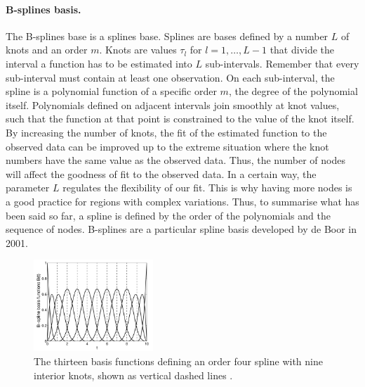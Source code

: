 \paragraph{B-splines basis.} The B-splines base is a splines base. Splines are bases defined by a number $L$ of knots and an order $m$. Knots are values $\tau_l$ for $l=1,\dots,L-1$ that divide the interval a function has to be estimated into $L$ sub-intervals. Remember that every sub-interval must contain at least one observation. On each sub-interval, the spline is a polynomial function of a specific order $m$, the degree of the polynomial itself. Polynomials defined on adjacent intervals join smoothly at knot values, such that the function at that point is constrained to the value of the knot itself. By increasing the number of knots, the fit of the estimated function to the observed data can be improved up to the extreme situation where the knot numbers have the same value as the observed data. Thus, the number of nodes will affect the goodness of fit to the observed data. In a certain way, the parameter $L$ regulates the flexibility of our fit. This is why having more nodes is a good practice for regions with complex variations. Thus, to summarise what has been said so far, a spline is defined by the order of the polynomials and the sequence of nodes. B-splines are a particular spline basis developed by de Boor in 2001. 
\begin{figure}
\centering
\includegraphics[width=0.4\textwidth]{Images/bspline.png}
\caption[Bsplines fitting.]{The thirteen basis functions defining an order four spline with nine interior knots, shown as vertical dashed lines \cite{ramsay_functional_2006}.}
\label{fig:bspline_13}
\end{figure}

